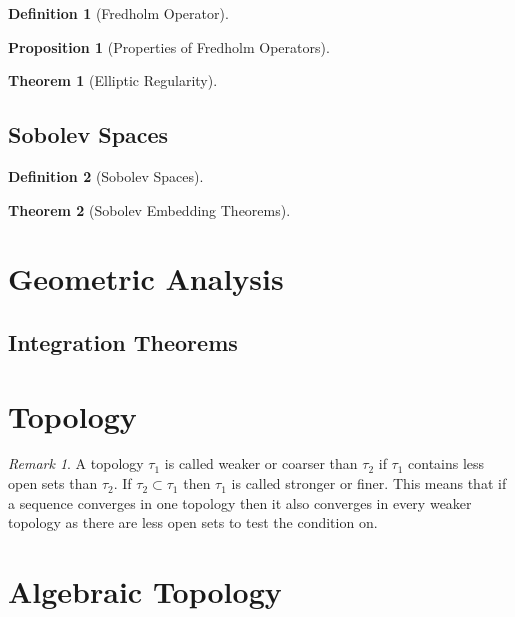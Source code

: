 \documentclass[a4paper]{article}
\theoremstyle{definition}
\newtheorem{thm}{Theorem}
\newtheorem{prop}{Proposition}
\theoremstyle{definition}
\newtheorem{definition}{Definition}
\theoremstyle{remark}
\newtheorem{rmk}{Remark}
\theoremstyle{remark}
\theoremstyle{remark}
\begin{document}
\begin{definition}[Fredholm Operator]
  
\end{definition}

\begin{prop}[Properties of Fredholm Operators]
  
\end{prop}

\begin{thm}[Elliptic Regularity]
  
\end{thm}

\subsection{Sobolev Spaces}

\begin{definition}[Sobolev Spaces]
  
\end{definition}

\begin{thm}[Sobolev Embedding Theorems]
  
\end{thm}

\section{Geometric Analysis}

\subsection{Integration Theorems}

\section{Topology}

\begin{rmk}
  A topology $\tau_1$ is called weaker or coarser than $\tau_2$ if $\tau_1$ contains less open sets than $\tau_2$. If $\tau_2\subset\tau_1$ then $\tau_1$ is called stronger or finer. This means that if a sequence converges in one topology then it also converges in every weaker topology as there are less open sets to test the condition on.
\end{rmk}

\section{Algebraic Topology}
\end{document}
